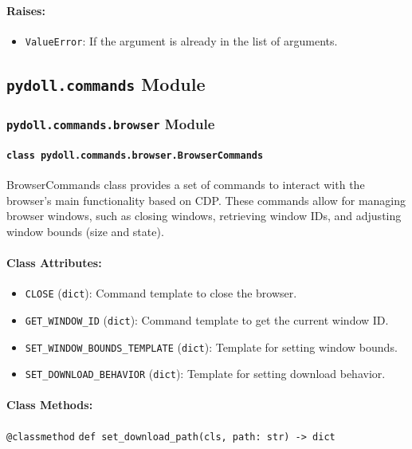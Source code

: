 \documentclass{article}
\begin{document}
\paragraph{Raises:}
\begin{itemize}
    \item \texttt{ValueError}: If the argument is already in the list of arguments.
\end{itemize}

\hrulefill

\subsection*{\texttt{pydoll.commands} Module}

\subsubsection*{\texttt{pydoll.commands.browser} Module}

\paragraph*{\texttt{class pydoll.commands.browser.BrowserCommands}}
\noindent BrowserCommands class provides a set of commands to interact with the browser's main functionality based on CDP\@. These commands allow for managing browser windows, such as closing windows, retrieving window IDs, and adjusting window bounds (size and state).

\paragraph{Class Attributes:}
\begin{itemize}
    \item \texttt{CLOSE} (\texttt{dict}): Command template to close the browser.
    \item \texttt{GET\_WINDOW\_ID} (\texttt{dict}): Command template to get the current window ID.
    \item \texttt{SET\_WINDOW\_BOUNDS\_TEMPLATE} (\texttt{dict}): Template for setting window bounds.
    \item \texttt{SET\_DOWNLOAD\_BEHAVIOR} (\texttt{dict}): Template for setting download behavior.
\end{itemize}

\paragraph{Class Methods:}
\noindent\texttt{@classmethod}
\noindent\texttt{def set\_download\_path(cls, path: str) -> dict}
\end{document}
